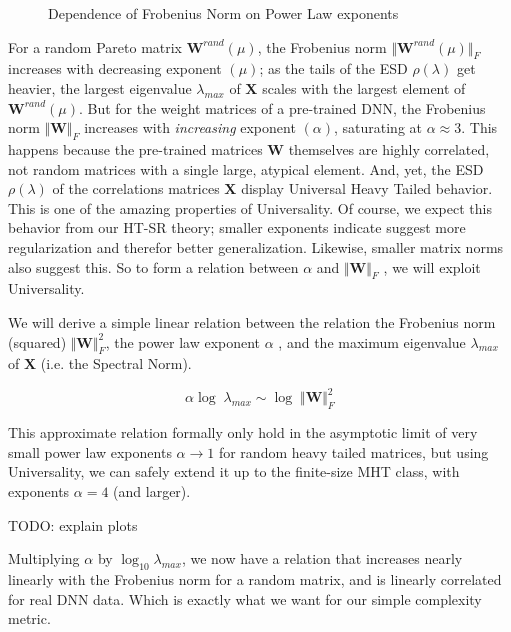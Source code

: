 {\begin{figure}[!htb]
{        \label{fig:fro-vgg11}
    }
        \caption{Dependence of Frobenius Norm on Power Law exponents}
    \label{fig:fnorm}
\end{figure}



 For a random Pareto matrix $\mathbf{W}^{rand}(\mu)$,  the Frobenius norm  $\Vert\mathbf{W}^{rand}(\mu)\Vert_{F}$ increases with 
 decreasing exponent $(\mu)$;  as the tails of the ESD $\rho(\lambda)$ get heavier, the largest eigenvalue $\lambda_{max}$ of $\mathbf{X}$
  scales with the largest element of  $\mathbf{W}^{rand}(\mu)$.  But for the weight matrices of a pre-trained DNN,
  the Frobenius norm $\Vert\mathbf{W}\Vert_{F}$ increases with \emph{increasing} exponent $(\alpha)$, saturating at $\alpha\approx 3$.
  This happens because the pre-trained matrices  $\mathbf{W}$ themselves are highly correlated, not random matrices
  with a single large, atypical element.   And, yet, the ESD $\rho(\lambda)$ of the correlations matrices $\mathbf{X}$ display
  Universal Heavy Tailed behavior. This is one of the amazing properties of Universality.
  Of course, we expect this behavior from our  HT-SR theory; smaller exponents indicate suggest more regularization
  and therefor better generalization.  Likewise, smaller matrix norms also suggest this.  
  So to form a relation between $\alpha$ and  $\Vert\mathbf{W}\Vert_{F}$ , we will exploit Universality.  

We will derive a simple linear relation between the relation the Frobenius norm (squared) $\Vert\mathbf{W}\Vert^{2}_{F}$, the
power law exponent  $\alpha$ , and the maximum eigenvalue $\lambda_{max}$ of $\mathbf{X}$ (i.e. the Spectral Norm).  

$$\alpha\log\;\lambda_{max}\sim\log\;\Vert\mathbf{W}\Vert^{2}_{F}$$

This approximate relation formally only hold in the asymptotic limit of very small power law exponents $\alpha\rightarrow 1$ for
random heavy tailed matrices, but using Universality, we can safely extend it up to the finite-size MHT class, with
exponents $\alpha=4$ (and larger).  

TODO:  explain plots

Multiplying $\alpha$ by $\log_{10}\lambda_{max}$, we now have a relation that increases nearly linearly with the Frobenius norm
for a random matrix, and is linearly correlated for real DNN data. Which is exactly what we want for our simple complexity metric.


}
